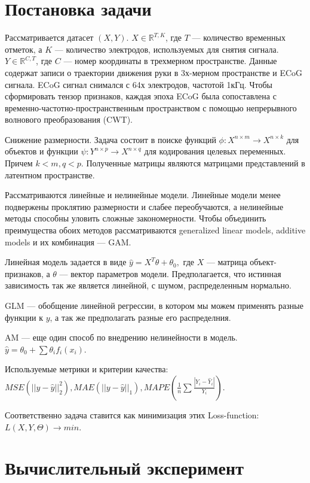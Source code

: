 \documentclass{article}
\begin{document}
\section{Постановка задачи}
Рассматривается датасет $(X, Y).$ $ X \in \mathds{R}^{T, K}$, где $T$ --- количество временных отметок, а $K$ ---  количество электродов, используемых для снятия сигнала. $Y \in \mathds{R}^{C, T}$, где $C$ --- номер координаты в трехмерном пространстве. Данные содержат записи о траектории движения руки в 3х-мерном пространстве и ECoG сигнала. ECoG сигнал снимался с 64х электродов, частотой 1кГц. Чтобы сформировать тензор признаков, каждая эпоха ECoG была сопоставлена с временно-частотно-пространственным пространством с помощью непрерывного волнового преобразования (CWT). %
\par
Снижение размерности. Задача состоит в поиске функций $\phi: X^{n\times m} \rightarrow X^{n\times k}$ для объектов и функции  $\psi: Y^{n\times p} \rightarrow X^{n\times q}$ для кодирования целевых переменных. Причем $k < m, q < p.$ Полученные матрицы являются матрицами представлений в латентном пространстве.
\par
\par
Рассматриваются линейные и нелинейные модели. Линейные модели менее подвержены проклятию размерности и слабее переобучаются, а нелинейные методы способны уловить сложные закономерности. Чтобы объединить преимущества обоих методов рассматриваются generalized linear models, additive models и их комбинация --- GAM. \par
Линейная модель задается в виде $\hat y = X^T\theta + \theta_0,$ где $X$ --- матрица объект-признаков, а $\theta$ --- вектор параметров модели. Предполагается, что истинная зависимость так же является линейной, с шумом, распределенным нормально. \par
GLM --- обобщение линейной регрессии, в котором мы можем применять разные функции к $y$, а так же предполагать разные его распределния. \par
AM --- еще один способ по внедрению нелинейности в модель. $\hat y = \theta_0 + \sum \theta_i f_i(x_i)$. \par
Используемые метрики и критерии качества: $MSE(||y-\hat y||_2^2 ), MAE(||y-\hat y||_1), MAPE(\frac{1}{n}\sum \frac{|Y_i-\hat Y_i|}{Y_i})$.  \par
Соответственно задача ставится как минимизация этих Loss-function: $L(X, Y, \Theta) \rightarrow min.$

\section{Вычислительный эксперимент}
\end{document}
